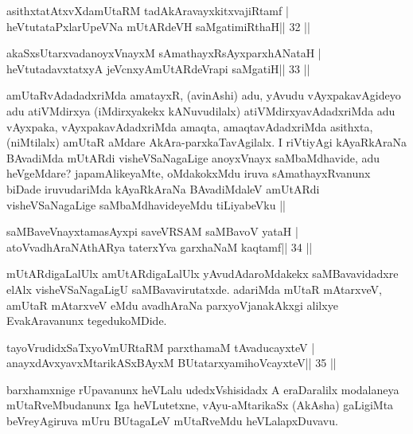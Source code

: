 \begin{shl}
asithxtatAtxvXdamUtaRM tadAkAravayxkitxvajiRtamf |
heVtutataPxlarUpeVNa mUtARdeVH saMgatimiRthaH\hfill || 32 ||
\end{shl}

\begin{shl}
akaSxsUtarxvadanoyxVnayxM sAmathayxRsAyxparxhANataH |
heVtutadavxtatxyA jeVcnxyA\s mUtARdeVrapi saMgatiH\hfill || 33 ||
\end{shl}

\begin{artha}
amUtaRvAdadadxriMda amatayxR, (avinAshi) adu, yAvudu vAyxpakavAgideyo
adu atiVMdirxya (iMdirxyakekx kANuvudilalx) atiVMdirxyavAdadxriMda
adu vAyxpaka, vAyxpakavAdadxriMda amaqta, amaqtavAdadxriMda asithxta,
(niMtilalx) amUtaR aMdare AkAra-parxkaTavAgilalx. I riVtiyAgi
kAyaRkAraNa BAvadiMda mUtARdi visheVSaNagaLige anoyxVnayx saMbaMdhavide,
adu heVgeMdare? japamAlikeyaMte, oMdakokxMdu iruva sAmathayxRvanunx
biDade iruvudariMda kAyaRkAraNa BAvadiMdaleV amUtARdi visheVSaNagaLige
saMbaMdhavideyeMdu tiLiyabeVku ||
\end{artha}


\begin{shl}
saMBaveV\s nayxtamasAyxpi saveVRSAM saMBavoV yataH |
atoV\s vadhAraNAthARya taterxYva garxhaNaM kaqtamf\hfill || 34 ||
\end{shl}

\begin{artha}
mUtARdigaLalUlx amUtARdigaLalUlx yAvudAdaroMdakekx saMBavavidadxre elAlx visheVSaNagaLigU saMBavavirutatxde. adariMda mUtaR mAtarxveV, amUtaR mAtarxveV eMdu avadhAraNa parxyoVjanakAkxgi alilxye EvakAravanunx tegedukoMDide.
\end{artha}



\begin{shl}
tayoVrudidxSaTxyoVmURtaRM parxthamaM tAvaducayxteV |
anayxdAvxyavxMtarikASxBAyxM BUtatarxyamihoVcayxteV\hfill || 35 ||
\end{shl}

\begin{artha}
barxhamxnige rUpavanunx heVLalu udedxVshisidadx A eraDaralilx modalaneya mUtaRveMbudanunx Iga heVLutetxne, vAyu-aMtarikaSx (AkAsha) gaLigiMta beVreyAgiruva mUru BUtagaLeV mUtaRveMdu heVLalapxDuvavu.
\end{artha}

